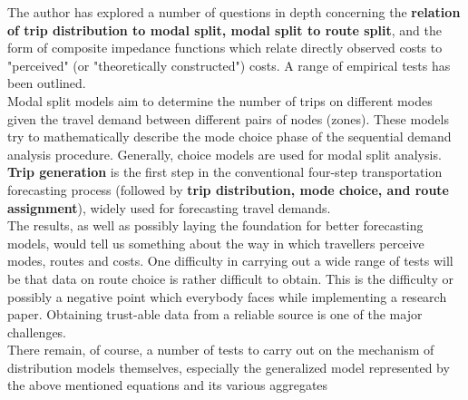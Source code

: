 \documentclass[12pt]{article}
\begin{document}
 The author has explored a number of questions in depth concerning the \textbf{relation of trip
 distribution to modal split, modal split to route split}, and the form of composite
 impedance functions which relate directly observed costs to "perceived" (or
 "theoretically constructed") costs. A range of empirical tests has been outlined. \\
 \newline
 Modal split models aim to determine the number of trips on different modes given the travel demand between different pairs of nodes (zones). These models try to mathematically describe the mode choice phase of the sequential demand analysis procedure. Generally, choice models are used for modal split analysis.
 \\
 \newline
 \textbf{Trip generation} is the first step in the conventional four-step transportation forecasting process (followed by \textbf{trip distribution, mode choice, and route assignment}), widely used for forecasting travel demands.\\
 \newline The
 results, as well as possibly laying the foundation for better forecasting models,
 would tell us something about the way in which travellers perceive modes,
 routes and costs. One difficulty in carrying out a wide range of tests will be that
 data on route choice is rather difficult to obtain. This is the difficulty or possibly a negative point which everybody faces while implementing a research paper. Obtaining trust-able data from a reliable source is one of the major challenges. \\
 
 There remain, of course, a number
 of tests to carry out on the mechanism of distribution models themselves, especially
 the generalized model represented by the above mentioned equations and its various aggregates
\end{document}
